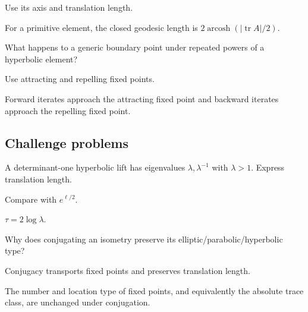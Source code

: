 \begin{hint}
Use its axis and translation length.
\end{hint}

\begin{solution}
For a primitive element, the closed geodesic length is \(2\operatorname{arcosh}(|\operatorname{tr}A|/2)\).
\end{solution}

\begin{exercise}[Dynamics]\label{exr:vii34-ped-14}
What happens to a generic boundary point under repeated powers of a hyperbolic element?
\end{exercise}

\begin{hint}
Use attracting and repelling fixed points.
\end{hint}

\begin{solution}
Forward iterates approach the attracting fixed point and backward iterates approach the repelling fixed point.
\end{solution}

\subsection*{Challenge problems}

\begin{exercise}\label{exr:vii34-ped-15}
A determinant-one hyperbolic lift has eigenvalues \(\lambda,\lambda^{-1}\) with \(\lambda>1\).  Express translation length.
\end{exercise}

\begin{hint}
Compare with \(e^{\ell/2}\).
\end{hint}

\begin{solution}
\(\tau=2\log\lambda\).
\end{solution}

\begin{exercise}\label{exr:vii34-ped-16}
Why does conjugating an isometry preserve its elliptic/parabolic/hyperbolic type?
\end{exercise}

\begin{hint}
Conjugacy transports fixed points and preserves translation length.
\end{hint}

\begin{solution}
The number and location type of fixed points, and equivalently the absolute trace class, are unchanged under conjugation.
\end{solution}

